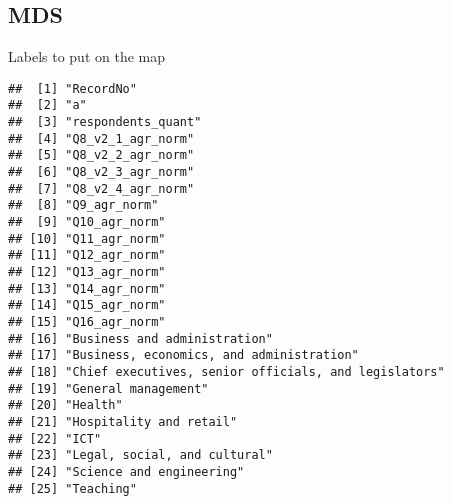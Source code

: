 \documentclass[]{article}
\newenvironment{Shaded}{\begin{snugshade}}{\end{snugshade}}
\newcommand{\KeywordTok}[1]{\textcolor[rgb]{0.13,0.29,0.53}{\textbf{{#1}}}}
\newcommand{\DecValTok}[1]{\textcolor[rgb]{0.00,0.00,0.81}{{#1}}}
\newcommand{\StringTok}[1]{\textcolor[rgb]{0.31,0.60,0.02}{{#1}}}
\newcommand{\NormalTok}[1]{{#1}}
\begin{document}
\subsection{MDS}\label{mds}

Labels to put on the map

\begin{Shaded}
\end{Shaded}

\begin{verbatim}
##  [1] "RecordNo"                                           
##  [2] "a"                                                  
##  [3] "respondents_quant"                                  
##  [4] "Q8_v2_1_agr_norm"                                   
##  [5] "Q8_v2_2_agr_norm"                                   
##  [6] "Q8_v2_3_agr_norm"                                   
##  [7] "Q8_v2_4_agr_norm"                                   
##  [8] "Q9_agr_norm"                                        
##  [9] "Q10_agr_norm"                                       
## [10] "Q11_agr_norm"                                       
## [11] "Q12_agr_norm"                                       
## [12] "Q13_agr_norm"                                       
## [13] "Q14_agr_norm"                                       
## [14] "Q15_agr_norm"                                       
## [15] "Q16_agr_norm"                                       
## [16] "Business and administration"                        
## [17] "Business, economics, and administration"            
## [18] "Chief executives, senior officials, and legislators"
## [19] "General management"                                 
## [20] "Health"                                             
## [21] "Hospitality and retail"                             
## [22] "ICT"                                                
## [23] "Legal, social, and cultural"                        
## [24] "Science and engineering"                            
## [25] "Teaching"
\end{verbatim}

\begin{Shaded}
\end{Shaded}
\end{document}
